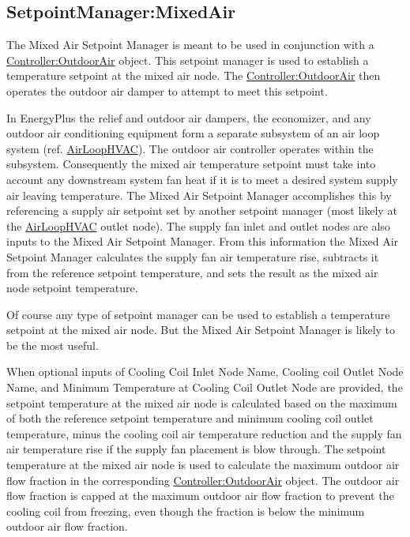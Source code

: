 \subsection{SetpointManager:MixedAir}\label{setpointmanagermixedair}

The Mixed Air Setpoint Manager is meant to be used in conjunction with a \hyperref[controlleroutdoorair]{Controller:OutdoorAir} object. This setpoint manager is used to establish a temperature setpoint at the mixed air node. The \hyperref[controlleroutdoorair]{Controller:OutdoorAir} then operates the outdoor air damper to attempt to meet this setpoint.

In EnergyPlus the relief and outdoor air dampers, the economizer, and any outdoor air conditioning equipment form a separate subsystem of an air loop system (ref. \hyperref[airloophvac]{AirLoopHVAC}). The outdoor air controller operates within the subsystem. Consequently the mixed air temperature setpoint must take into account any downstream system fan heat if it is to meet a desired system supply air leaving temperature. The Mixed Air Setpoint Manager accomplishes this by referencing a supply air setpoint set by another setpoint manager (most likely at the \hyperref[airloophvac]{AirLoopHVAC} outlet node). The supply fan inlet and outlet nodes are also inputs to the Mixed Air Setpoint Manager. From this information the Mixed Air Setpoint Manager calculates the supply fan air temperature rise, subtracts it from the reference setpoint temperature, and sets the result as the mixed air node setpoint temperature.

Of course any type of setpoint manager can be used to establish a temperature setpoint at the mixed air node. But the Mixed Air Setpoint Manager is likely to be the most useful.

When optional inputs of Cooling Coil Inlet Node Name, Cooling coil Outlet Node Name, and Minimum Temperature at Cooling Coil Outlet Node are provided, the setpoint temperature at the mixed air node is calculated based on the maximum of both the reference setpoint temperature and minimum cooling coil outlet temperature, minus the cooling coil air temperature reduction and the supply fan air temperature rise if the supply fan placement is blow through. The setpoint temperature at the mixed air node is used to calculate the maximum outdoor air flow fraction in the corresponding \hyperref[controlleroutdoorair]{Controller:OutdoorAir} object. The outdoor air flow fraction is capped at the maximum outdoor air flow fraction to prevent the cooling coil from freezing, even though the fraction is below the minimum outdoor air flow fraction.

